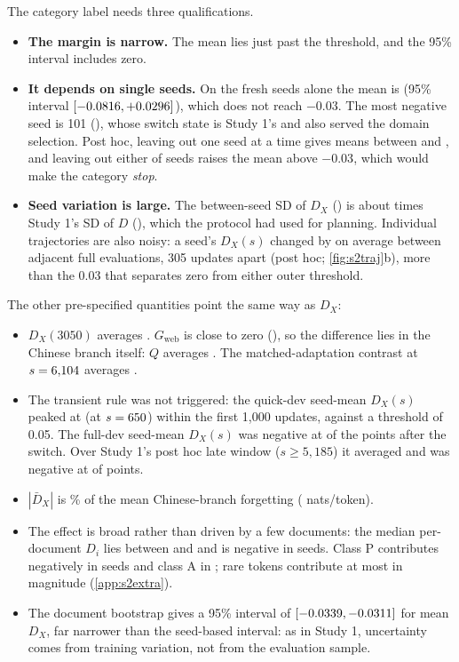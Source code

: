 \documentclass[11pt]{article}
\begin{document}
The category label needs three qualifications.
\begin{itemize}[leftmargin=1.4em,itemsep=2pt]
  \item \textbf{The margin is narrow.} The mean lies just past the threshold, and the 95\% interval includes zero.
  \item \textbf{It depends on single seeds.} On the fresh seeds alone the mean is \twoFreshMean{} (95\%
        interval $[-0.0816, {+}0.0296]$), which does not reach $-0.03$. The most negative seed is 101
        (\twoDmin), whose switch state is Study 1's and also served the domain selection. Post hoc, leaving out
        one seed at a time gives means between \twoLooMin{} and \twoLooMax, and leaving out either of seeds
        \twoLooFlip{} raises the mean above $-0.03$, which would make the category \emph{stop}.
  \item \textbf{Seed variation is large.} The between-seed SD of $D_X$ (\twoDsd) is about \twoSdRatio{} times
        Study 1's SD of $D$ (\Dsd), which the protocol had used for planning. Individual trajectories are also
        noisy: a seed's $D_X(s)$ changed by \twoJitter{} on average between adjacent full evaluations, 305 updates
        apart (post hoc; \cref{fig:s2traj}b), more than the 0.03 that separates zero from either outer threshold.
\end{itemize}

The other pre-specified quantities point the same way as $D_X$:
\begin{itemize}[leftmargin=1.4em,itemsep=2pt]
  \item $D_X(3050)$ averages \twoDthree. $G_{\text{web}}$ is close to zero (\twoGmean), so the difference lies in
        the Chinese branch itself: $Q$ averages \twoQmean. The matched-adaptation contrast at
        $s = 6{,}104$ averages \twoMatched.
  \item The transient rule was not triggered: the quick-dev seed-mean $D_X(s)$ peaked at \twoEarlyMax{} (at
        $s = 650$) within the first 1{,}000 updates, against a threshold of 0.05. The full-dev
        seed-mean $D_X(s)$ was negative at \twoTrajNeg{} of the \twoTrajN{} points after the switch. Over Study
        1's post hoc late window ($s \ge 5{,}185$) it averaged \twoLateMean{} and was negative at \twoLateNeg{} of
        \twoLateCount{} points.
  \item $|\bar D_X|$ is \twoDrelPct\% of the mean Chinese-branch forgetting (\twoFxMean{} nats/token).
  \item The effect is broad rather than driven by a few documents: the median per-document $D_i$ lies between
        \twoMedianMin{} and \twoMedianMax{} and is negative in \twoMedianNeg{} seeds. Class P contributes
        negatively in \twoClassPneg{} seeds and class A in \twoClassAneg; rare tokens contribute at most
        \twoRareMax{} in magnitude (\cref{app:s2extra}).
  \item The document bootstrap gives a 95\% interval of $[-0.0339, -0.0311]$ for mean $D_X$, far narrower
        than the seed-based interval: as in Study 1, uncertainty comes from training variation, not from the
        evaluation sample.
\end{itemize}
\end{document}
